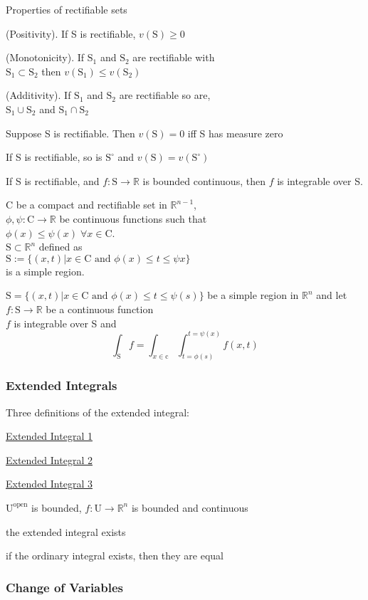 Properties of rectifiable sets
\begin{myenumerate}
\item (Positivity). If S is rectifiable, $v(\mathrm{S})\geq 0$
\item (Monotonicity). If $\mathrm{S}_1$ and $\mathrm{S}_2$ are rectifiable with\\ 
$\mathrm{S}_1\subset\mathrm{S}_2$ then $v(\mathrm{S}_1)\leq v(\mathrm{S}_2)$
\item (Additivity). If $\mathrm{S}_1$ and $\mathrm{S}_2$ are rectifiable so are,\\
$\mathrm{S}_1\cup\mathrm{S}_2$ and $\mathrm{S}_1\cap\mathrm{S}_2$
\item Suppose S is rectifiable. Then $v(\mathrm{S})=0$ iff S has measure zero
\item If S is rectifiable, so is $\mathrm{S^{\circ}}$ and $v(\mathrm{S})=v(\mathrm{S}^{\circ})$
\item If S is rectifiable, and $f:\mathrm{S}\to\mathbb{R}$ is bounded continuous, 
then $f$ is integrable over S.
\end{myenumerate}


\LET C be a compact and rectifiable set in $\mathbb{R}^{n-1}$,\\
$\phi,\psi:\mathrm{C}\to\mathbb{R}$ be continuous functions such that\\ 
$\phi(x)\leq\psi(x)\;\forall x\in\mathrm{C}$.\\
\THEN $\mathrm{S}\subset\mathbb{R}^n$ defined as \\
$\mathrm{S}:=\{(x,t)|x\in\mathrm{C}\text{ and } \phi(x)\leq t\leq\psi{x}\}$\\
is a simple region.
\newpage

\LET 
$\mathrm{S}=\{(x,t)| x\in\mathrm{C}\text{ and } \phi(x)\leq t\leq\psi(s)\}$
be a simple region in $\mathbb{R}^n$ and let
$f:\mathrm{S}\to\mathbb{R}$ be a continuous function\\
\THEN $f$ is integrable over S and\\
$$\int_{\mathrm{S}}f = \int_{x\in\mathrm{c}}\int_{t=\phi(s)}^{t=\psi(x)}f(x,t)$$

\subsubsection{Extended Integrals}
Three definitions of the extended integral:
\begin{myenumerate}
\item\hyperref[defn:extended integral]{Extended Integral 1}
\item\hyperref[thm:mnk 15.2]{Extended Integral 2}
\item\hyperref[thm:mnk 16.5]{Extended Integral 3}
\end{myenumerate}

\LET
 $\mathrm{U^{open}}$ is bounded,
$f:\mathrm{U}\to\mathbb{R}^n $ is bounded and continuous\\
\THEN
\begin{myenumerate}
\item the extended integral exists
\item if the ordinary integral exists, then they are equal
\end{myenumerate}

\subsubsection{Change of Variables}
\TODO

